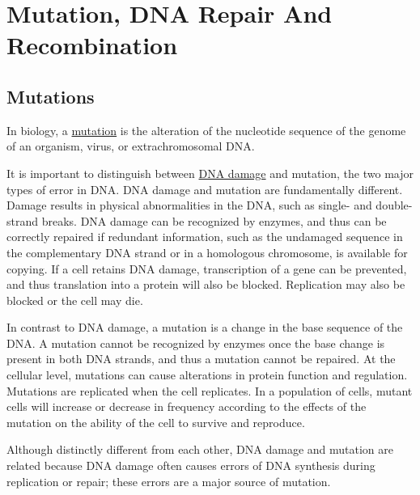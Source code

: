 \chapter{Mutation, DNA Repair And Recombination}\label{mutation-dna-repair-and-recombination}

\hypertarget{mutations-1}{%
\section{Mutations}\label{mutations-1}}

In biology, a \href{https://en.wikipedia.org/wiki/Mutation}{mutation} is the alteration of the nucleotide sequence of the genome of an organism, virus, or extrachromosomal DNA.

It is important to distinguish between \href{https://en.wikipedia.org/wiki/DNA_damage_(naturally_occurring)}{DNA damage} and mutation, the two major types of error in DNA. DNA damage and mutation are fundamentally different. Damage results in physical abnormalities in the DNA, such as single- and double-strand breaks. DNA damage can be recognized by enzymes, and thus can be correctly repaired if redundant information, such as the undamaged sequence in the complementary DNA strand or in a homologous chromosome, is available for copying. If a cell retains DNA damage, transcription of a gene can be prevented, and thus translation into a protein will also be blocked. Replication may also be blocked or the cell may die.

In contrast to DNA damage, a mutation is a change in the base sequence of the DNA. A mutation cannot be recognized by enzymes once the base change is present in both DNA strands, and thus a mutation cannot be repaired. At the cellular level, mutations can cause alterations in protein function and regulation. Mutations are replicated when the cell replicates. In a population of cells, mutant cells will increase or decrease in frequency according to the effects of the mutation on the ability of the cell to survive and reproduce.

Although distinctly different from each other, DNA damage and mutation are related because DNA damage often causes errors of DNA synthesis during replication or repair; these errors are a major source of mutation.

